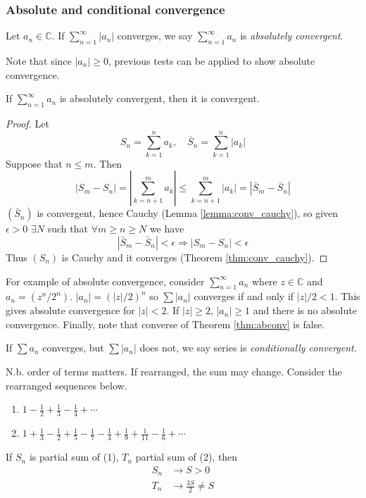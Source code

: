 \documentclass[10pt, a4paper, twoside]{report}
\begin{document}
\subsubsection{Absolute  and conditional convergence}
\begin{definition}
    Let \(a_n\in\mathbb{C}\). If \(\sum_{n=1}^{\infty}|a_n|\) converges, we say \(\sum_{n=1}^\infty a_n\) is \emph{absolutely convergent}.
\end{definition}
Note that since \(|a_n|\geq 0\), previous tests can be applied to show absolute convergence.
\begin{theorem}
    If \(\sum_{n=1}^{\infty}a_n\) is absolutely convergent, then it is convergent.
    \label{thm:abconv}
\end{theorem}
\begin{proof}
    Let
    \[S_n=\sum_{k=1}^{n}a_k,\quad\bar{S}_n=\sum_{k=1}^{n}|a_k|\]
    Suppose that \(n\leq m\). Then
    \[|S_m-S_n|=\left|\sum_{k=n+1}^{m}a_k\right|\leq\sum_{k=n+1}^{m}|a_k|=|\bar{S}_m-\bar{S}_n|\]
    \((\bar{S}_n)\) is convergent, hence Cauchy (Lemma \ref{lemma:conv_cauchy}), so given \(\epsilon>0\) \(\exists N\) such that \(\forall m\geq n\geq N\) we have 
    \[|\bar{S}_m-\bar{S}_n|<\epsilon\Rightarrow|S_m-S_n|<\epsilon\]
    Thus \((S_n)\) is Cauchy and it converges (Theorem \ref{thm:conv_cauchy}).
\end{proof}
For example of absolute convergence, consider \(\sum_{n=1}^{\infty}a_n\) where \(z\in\mathbb{C}\) and \(a_n=(z^n/2^n)\). \(|a_n|=(|z|/2)^n\) so \(\sum|a_n|\) converges if and only if \(|z|/2<1\). This gives absolute convergence for \(|z|<2\). If \(|z|\geq 2\), \(|a_n|\geq 1\) and there is no absolute convergence. Finally, note that converse of Theorem \ref{thm:abconv} is false. 
\begin{definition}
    If \(\sum a_n\) converges, but \(\sum|a_n|\) does not, we say series is \emph{conditionally convergent}. 
\end{definition}
N.b. order of terms matters. If rearranged, the sum may change. Consider the rearranged sequences below.
\begin{enumerate}
    \item \(1-\frac 12+\frac 13-\frac 14+\cdots\)
    \item \(1+\frac 13-\frac 12+\frac 15-\frac 17-\frac 14+\frac 19+\frac 1{11}-\frac 16+\cdots\)
\end{enumerate}
If \(S_n\) is partial sum of (1), \(T_n\) partial sum of (2), then
\begin{align*}
    S_n&\to S>0 \\
    T_n&\to\frac{3S}{2}\neq S
\end{align*}
\end{document}
